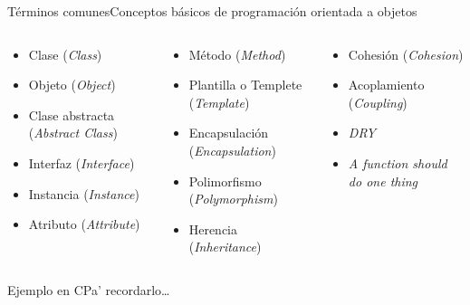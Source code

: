 \documentclass[spanish, c]{beamer}
\newcommand\CC{C\nolinebreak[4]\hspace{-.05em}\raisebox{.4ex}{\relsize{-3}{\textbf{++}}}}
\begin{document}
\begin{frame}{Términos comunes}{Conceptos básicos de programación orientada a objetos}
    \begin{columns}
        \begin{column}{0.33\textwidth}
            \begin{itemize}
                \item Clase (\textit{Class})
                \item Objeto (\textit{Object})
                \item Clase abstracta (\textit{Abstract Class})
                \item Interfaz (\textit{Interface})
                \item Instancia (\textit{Instance})
                \item Atributo (\textit{Attribute})
            \end{itemize}
        \end{column}
        \begin{column}{0.33\textwidth}
            \begin{itemize}
                \item Método (\textit{Method})
                \item Plantilla o Templete (\textit{Template})
                \item Encapsulación (\textit{Encapsulation})
                \item Polimorfismo (\textit{Polymorphism})
                \item Herencia (\textit{Inheritance})
            \end{itemize}
        \end{column}
        \begin{column}{0.3\textwidth}
            \begin{itemize}
                \item Cohesión (\textit{Cohesion})
                \item Acoplamiento (\textit{Coupling})
                \item \textit{DRY}
                \item \textit{A function should do one thing}
            \end{itemize}
        \end{column}
    \end{columns}
\end{frame}

\begin{frame}[fragile]{Ejemplo en \texorpdfstring{\protect\CC}{C++}}{Pa' recordarlo\dots}
    \inputminted[linenos, breaklines, fontsize=\scriptsize]{c++}{../../hello.cpp}
\end{frame}



\end{document}
